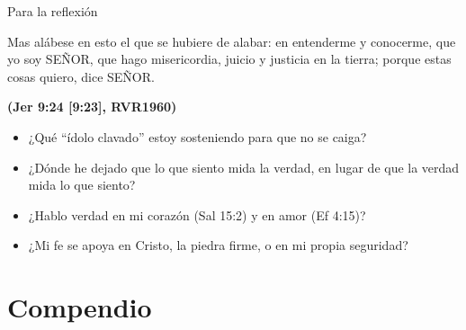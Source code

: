 \documentclass[hyperref={bookmarks=false},aspectratio=169]{beamer}
\newcommand{\SENOR}{S{\fontsize{0.78em}{1em}\selectfont EÑOR}}
\newcommand{\fuente}[1]{\par\hfill{\upshape\bfseries\footnotesize\textcolor{azul}{#1}}}
\begin{document}
\begin{frame}{Para la reflexión}
\begin{cita}Mas alábese en esto el que se hubiere de alabar: en entenderme y conocerme, que yo soy \SENOR{}, que hago misericordia, juicio y justicia en la tierra; porque estas cosas quiero, dice \SENOR{}.\fuente{(Jer 9:24 [9:23], RVR1960)}\end{cita}
\small
\begin{itemize}
\item ¿Qué ``ídolo clavado'' estoy sosteniendo para que no se caiga?
\item ¿Dónde he dejado que lo que siento mida la verdad, en lugar de que la verdad mida lo que siento?
\item ¿Hablo verdad en mi corazón (Sal 15:2) y en amor (Ef 4:15)?
\item ¿Mi fe se apoya en Cristo, la piedra firme, o en mi propia seguridad?
\end{itemize}
\end{frame}

\section{Compendio}
\end{document}
